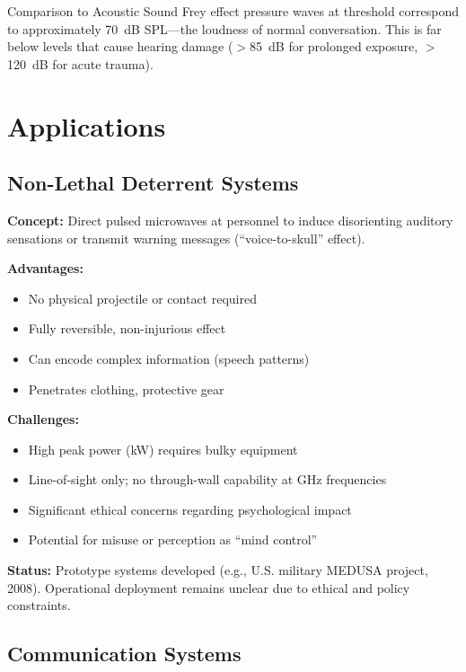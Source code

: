 \begin{calloutbox}{Comparison to Acoustic Sound}
Frey effect pressure waves at threshold correspond to approximately 70~dB SPL---the loudness of normal conversation. This is far below levels that cause hearing damage ($>$85~dB for prolonged exposure, $>$120~dB for acute trauma).
\end{calloutbox}

\section{Applications}

\subsection{Non-Lethal Deterrent Systems}

\textbf{Concept:} Direct pulsed microwaves at personnel to induce disorienting auditory sensations or transmit warning messages (``voice-to-skull'' effect).

\textbf{Advantages:}
\begin{itemize}
\item[\checkmark] No physical projectile or contact required
\item[\checkmark] Fully reversible, non-injurious effect
\item[\checkmark] Can encode complex information (speech patterns)
\item[\checkmark] Penetrates clothing, protective gear
\end{itemize}

\textbf{Challenges:}
\begin{itemize}
\item[\texttimes] High peak power (kW) requires bulky equipment
\item[\texttimes] Line-of-sight only; no through-wall capability at GHz frequencies
\item[\texttimes] Significant ethical concerns regarding psychological impact
\item[\texttimes] Potential for misuse or perception as ``mind control''
\end{itemize}

\textbf{Status:} Prototype systems developed (e.g., U.S. military MEDUSA project, 2008). Operational deployment remains unclear due to ethical and policy constraints.

\subsection{Communication Systems}

